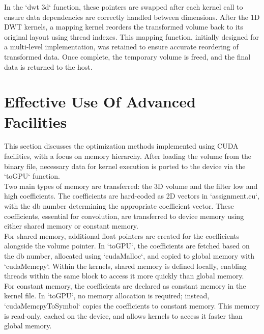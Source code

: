 \documentclass[journal,11pt]{IEEEtran}
\begin{document}
In the `dwt 3d` function, these pointers are swapped after each kernel call to ensure data dependencies are correctly handled between dimensions. After the 1D DWT kernels, a mapping kernel reorders the transformed volume back to its original layout using thread indexes. This mapping function, initially designed for a multi-level implementation, was retained to ensure accurate reordering of transformed data. Once complete, the temporary volume is freed, and the final data is returned to the host.

\section{Effective Use Of Advanced Facilities}

This section discusses the optimization methods implemented using CUDA facilities, with a focus on memory hierarchy. After loading the volume from the binary file, necessary data for kernel execution is ported to the device via the `toGPU` function.\\

Two main types of memory are transferred: the 3D volume and the filter low and high coefficients. The coefficients are hard-coded as 2D vectors in `assignment.cu`, with the db number determining the appropriate coefficient vector. These coefficients, essential for convolution, are transferred to device memory using either shared memory or constant memory.\\

For shared memory, additional float pointers are created for the coefficients alongside the volume pointer. In `toGPU`, the coefficients are fetched based on the db number, allocated using `cudaMalloc`, and copied to global memory with `cudaMemcpy`. Within the kernels, shared memory is defined locally, enabling threads within the same block to access it more quickly than global memory.\\

For constant memory, the coefficients are declared as constant memory in the kernel file. In `toGPU`, no memory allocation is required; instead, `cudaMemcpyToSymbol` copies the coefficients to constant memory. This memory is read-only, cached on the device, and allows kernels to access it faster than global memory.\\
\end{document}
